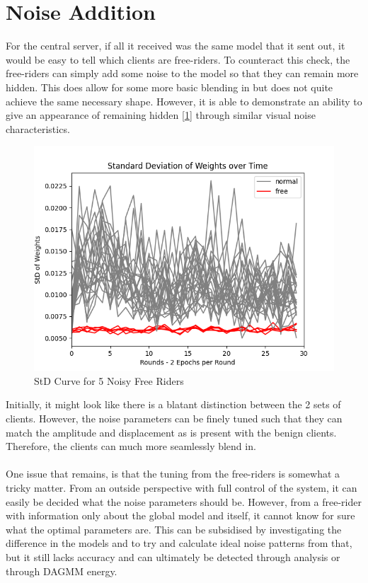 \section{Noise Addition}
For the central server, if all it received was the same model that it sent out, it would be easy to tell which clients are free-riders. 
To counteract this check, the free-riders can simply add some noise to the model so that they can remain more hidden.
This does allow for some more basic blending in but does not quite achieve the same necessary shape. 
However, it is able to demonstrate an ability to give an appearance of remaining hidden [\ref{fig:std_noisy}] through similar visual noise characteristics.
\begin{figure}[htbp]
	\centering
    \includegraphics[scale=0.5]{free_riders/graphs/noisy5.png}
	\caption{StD Curve for 5 Noisy Free Riders}
	\label{fig:std_noisy}
\end{figure}

Initially, it might look like there is a blatant distinction between the 2 sets of clients.
However, the noise parameters can be finely tuned such that they can match the amplitude and displacement as is present with the benign clients.
Therefore, the clients can much more seamlessly blend in.
\\ \\
One issue that remains, is that the tuning from the free-riders is somewhat a tricky matter.
From an outside perspective with full control of the system, it can easily be decided what the noise parameters should be.
However, from a free-rider with information only about the global model and itself, it cannot know for sure what the optimal parameters are.
This can be subsidised by investigating the difference in the models and to try and calculate ideal noise patterns from that, but it still lacks accuracy and can ultimately be detected through analysis or through DAGMM energy.

